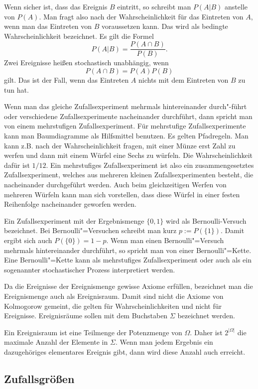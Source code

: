 \documentclass[a4paper,10pt,fleqn,twocolumn,twoside]{article}
\begin{document}
Wenn sicher ist, dass das Ereignis \(B\) eintritt, so schreibt
man \(P(A|B)\) anstelle von \(P(A)\). Man fragt also nach der
Wahrscheinlichkeit für das Eintreten von \(A\), wenn man das Eintreten
von \(B\) voraussetzen kann. Das wird als bedingte Wahrscheinlichkeit
bezeichnet. Es gilt die Formel
\[P(A|B) = \frac{P(A\cap B)}{P(B)}.\]
Zwei Ereignisse heißen stochastisch unabhängig, wenn
\[P(A\cap B) = P(A)P(B)\]
gilt. Das ist der Fall, wenn das Eintreten \(A\) nichts mit dem
Eintreten von \(B\) zu tun hat.

Wenn man das gleiche Zufallsexperiment mehrmals hintereinander
durch"-führt oder verschiedene Zufallsexperimente nacheinander
durchführt, dann spricht man von einem mehrstufigen
Zufallsexperiment. Für mehrstufige Zufallsexperimente kann man
Baumdiagramme als Hilfsmittel benutzen. Es gelten Pfadregeln.
Man kann z.B. nach der Wahrscheinlichkeit fragen, mit einer Münze
erst Zahl zu werfen und dann mit einem Würfel eine Sechs zu würfeln.
Die Wahrscheinlichkeit dafür ist \(1/12\). Ein mehrstufiges
Zufallsexperiment ist also ein zusammengesetztes Zufallsexperiment,
welches aus mehreren kleinen Zufallsexperimenten besteht, die
nacheinander durchgeführt werden. Auch beim gleichzeitigen Werfen
von mehreren Würfeln kann man sich vorstellen, dass diese Würfel
in einer festen Reihenfolge nacheinander geworfen werden.

Ein Zufallsexperiment mit der Ergebnismenge \(\{0,1\}\) wird als
Bernoulli-Versuch bezeichnet. Bei Bernoulli"=Versuchen schreibt man
kurz \(p:=P(\{1\})\). Damit ergibt sich auch \(P(\{0\})=1-p\).
Wenn man einen Bernoulli"=Versuch mehrmals hintereinander durchführt,
so spricht man von einer Bernoulli"=Kette. Eine Bernoulli"=Kette kann
als mehrstufiges Zufallsexperiment oder auch als ein sogenannter
stochastischer Prozess interpretiert werden.

Da die Ereignisse der Ereignismenge gewisse Axiome erfüllen,
bezeichnet man die Ereignismenge auch als Ereignisraum. Damit
sind nicht die Axiome von Kolmogorow gemeint, die gelten für
Wahrscheinlichkeiten und nicht für Ereignisse. Ereignisräume
sollen mit dem Buchstaben \(\Sigma\) bezeichnet werden.

Ein Ereignisraum ist eine Teilmenge der Potenzmenge von \(\Omega\).
Daher ist \(2^{|\Omega|}\) die maximale Anzahl der Elemente in
\(\Sigma\). Wenn man jedem Ergebnis ein dazugehöriges elementares
Ereignis gibt, dann wird diese Anzahl auch erreicht.

\subsection{Zufallsgrößen}
\end{document}
